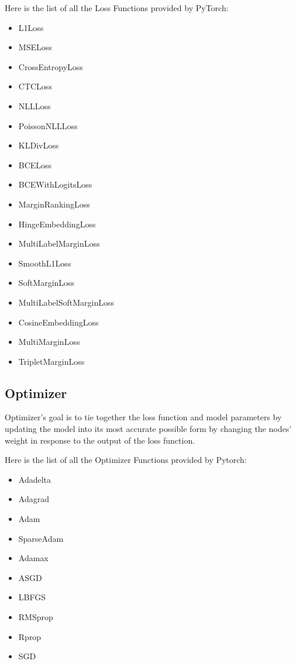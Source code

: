 \noindent Here is the list of all the Loss Functions provided by PyTorch:
\begin{itemize}
    \item L1Loss
    \item MSELoss
    \item CrossEntropyLoss
    \item CTCLoss
    \item NLLLoss
    \item PoissonNLLLoss
    \item KLDivLoss
    \item BCELoss
    \item BCEWithLogitsLoss
    \item MarginRankingLoss
    \item HingeEmbeddingLoss
    \item MultiLabelMarginLoss
    \item SmoothL1Loss
    \item SoftMarginLoss
    \item MultiLabelSoftMarginLoss
    \item CosineEmbeddingLoss
    \item MultiMarginLoss
    \item TripletMarginLoss
    
\end{itemize}

\subsection{Optimizer}
Optimizer's goal is to tie together the loss function and model parameters by updating the model into its most accurate possible form by changing the nodes' weight in response to the output of the loss function.

\noindent Here is the list of all the Optimizer Functions provided by Pytorch:
\begin{itemize}
    \item Adadelta
    \item Adagrad
    \item Adam
    \item SparseAdam
    \item Adamax
    \item ASGD
    \item LBFGS
    \item RMSprop
    \item Rprop
    \item SGD
\end{itemize}

